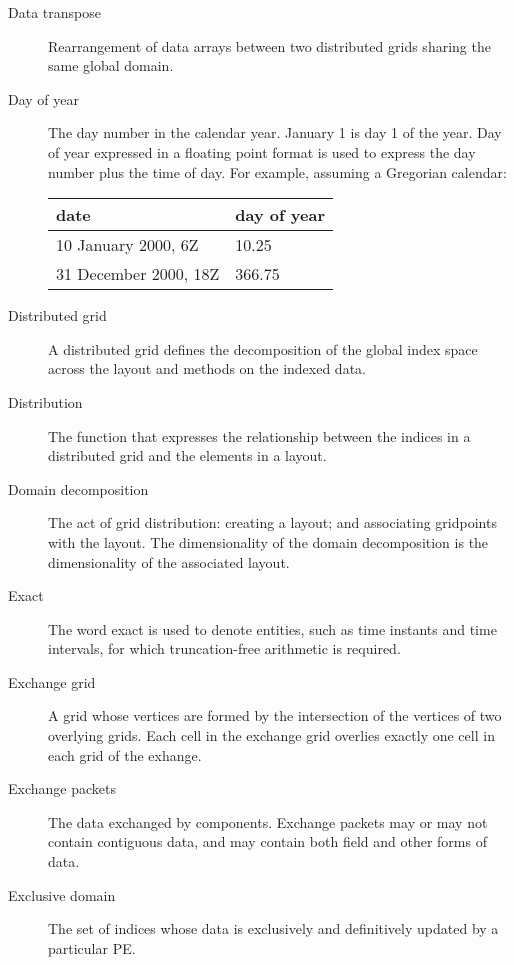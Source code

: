\begin{description}
\item[Data transpose] \label{glos:DataTranspose} Rearrangement of data arrays 
  between two distributed grids sharing the same global domain.

\item[Day of year] \label{glos:DayOfYear} The day number in the calendar year. 
January 1 is day 1 of the year. Day of year expressed in a floating point 
format is used to express the day number plus the time of day. 
For example, assuming a Gregorian calendar:

\begin{tabular}{ll}
{\bf date}              & {\bf day of year} \\
\hline 
10 January 2000, 6Z     & 10.25 \\
31 December 2000, 18Z   & 366.75 
\end{tabular}

\item[Distributed grid] \label{glos:DistGrid}
  A distributed grid defines the decomposition of the global index space 
  across the layout and methods on the indexed data.

\item[Distribution] \label{glos:Distribution} The function that expresses
the relationship between the indices in a distributed grid and the elements 
in a layout.  

\item[Domain decomposition] \label{glos:DomainDecomp} The act of grid 
  distribution: creating a layout; and associating gridpoints with the layout. 
  The dimensionality of the domain decomposition is the dimensionality of 
  the associated layout.

\item [Exact] \label{glos:Exact} The word exact is used
to denote entities, such as time instants and time intervals, for which truncation-free arithmetic is required. 

\item[Exchange grid] \label{glos:ExchangeGrid} A grid whose vertices are
formed by the intersection of the vertices of two overlying grids.  Each 
cell in the exchange grid overlies exactly one cell in each grid of the 
exhange.

\item[Exchange packets] \label{glos:EP} The data exchanged by components.  
  Exchange packets may or may not contain contiguous data, and may contain 
  both field and other forms of data.

\item[Exclusive domain] \label{glos:ExcDomain} The set of indices whose 
  data is exclusively and definitively updated by a particular PE.


\end{description}
